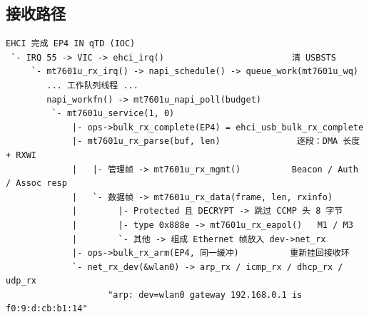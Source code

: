 \subsection{接收路径}
\begin{lstlisting}
EHCI 完成 EP4 IN qTD (IOC)
 `- IRQ 55 -> VIC -> ehci_irq()                         清 USBSTS
     `- mt7601u_rx_irq() -> napi_schedule() -> queue_work(mt7601u_wq)
        ... 工作队列线程 ...
        napi_workfn() -> mt7601u_napi_poll(budget)
         `- mt7601u_service(1, 0)
             |- ops->bulk_rx_complete(EP4) = ehci_usb_bulk_rx_complete
             |- mt7601u_rx_parse(buf, len)               逐段：DMA 长度 + RXWI
             |   |- 管理帧 -> mt7601u_rx_mgmt()          Beacon / Auth / Assoc resp
             |   `- 数据帧 -> mt7601u_rx_data(frame, len, rxinfo)
             |        |- Protected 且 DECRYPT -> 跳过 CCMP 头 8 字节
             |        |- type 0x888e -> mt7601u_rx_eapol()   M1 / M3
             |        `- 其他 -> 组成 Ethernet 帧放入 dev->net_rx
             |- ops->bulk_rx_arm(EP4, 同一缓冲)          重新挂回接收环
             `- net_rx_dev(&wlan0) -> arp_rx / icmp_rx / dhcp_rx / udp_rx
                    "arp: dev=wlan0 gateway 192.168.0.1 is f0:9:d:cb:b1:14"
\end{lstlisting}

